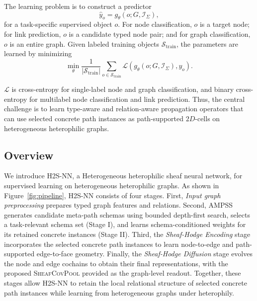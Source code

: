 \documentclass[sigconf,anonymous,review]{acmart}
\newcommand{\method}{\textsc{H2S-NN}}
\newcommand{\ampss}{\textsc{AMPSS}}
\newcommand{\sheafcovpool}{\textsc{SheafCovPool}}
\newcommand{\cL}{\mathcal{L}}
\begin{document}
The learning problem is to construct a predictor
\[
  \hat{y}_o
  =
  g_\theta(o;G,\mathcal{I}_\Sigma),
\]
for a task-specific supervised object \(o\).  For node classification, \(o\) is a target node; for
link prediction, \(o\) is a candidate typed node pair; and for graph classification, \(o\) is an
entire graph.  Given labeled training objects \(\mathcal{S}_{\mathrm{train}}\), the parameters are
learned by minimizing
\[
  \min_\theta
  \frac{1}{|\mathcal{S}_{\mathrm{train}}|}
  \sum_{o\in\mathcal{S}_{\mathrm{train}}}
  \mathcal{L}\!\left(g_\theta(o;G,\mathcal{I}_\Sigma),y_o\right).
\]

\(\cL\) is cross-entropy for single-label node and graph classification,
and binary cross-entropy for multilabel node classification and link prediction. Thus, the central challenge is to learn type-aware and relation-aware propagation operators that can use selected concrete path instances as path-supported \(2D\)-cells on heterogeneous heterophilic graphs.

\subsection{Overview}

We introduce \method{}, a Heterogeneous heterophilic sheaf neural network, for supervised learning on heterogeneous heterophilic graphs. As shown in Figure~\ref{fig:pipeline}, \method{} consists of four stages. First, \emph{Input graph preprocessing} prepares typed graph features and relations. Second, \ampss{} generates candidate meta-path schemas using bounded
depth-first search, selects a task-relevant schema set (Stage I), and learns schema-conditioned weights for its retained concrete instances (Stage II). Third, the \emph{Sheaf-Hodge Encoding} stage incorporates the selected concrete path instances to learn node-to-edge and path-supported edge-to-face geometry. Finally, the \emph{Sheaf-Hodge Diffusion} stage evolves the node and edge cochains to obtain their final representations, with the proposed \sheafcovpool{} provided as the graph-level readout. Together, these stages allow \method{} to retain the local relational structure of selected concrete path instances while learning from heterogeneous graphs under heterophily.
\end{document}
